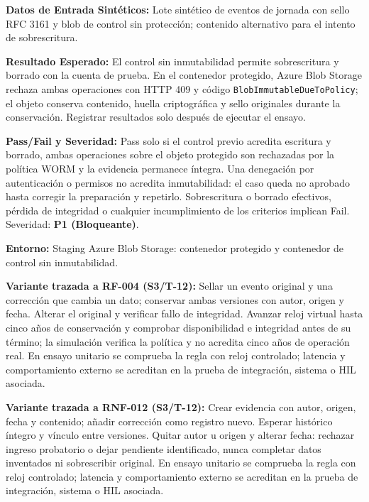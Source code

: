 \par\noindent\textbf{Datos de Entrada Sintéticos:} Lote sintético de eventos de jornada con sello RFC 3161 y blob de control sin protección; contenido alternativo para el intento de sobrescritura.\par
\par\noindent\textbf{Resultado Esperado:} El control sin inmutabilidad permite sobrescritura y borrado con la cuenta de prueba. En el contenedor protegido, Azure Blob Storage rechaza ambas operaciones con HTTP 409 y código \texttt{Blob\allowbreak{}Immutable\allowbreak{}Due\allowbreak{}To\allowbreak{}Policy}; el objeto conserva contenido, huella criptográfica y sello originales durante la conservación. Registrar resultados solo después de ejecutar el ensayo.\par
\par\noindent\textbf{Pass/Fail y Severidad:} Pass solo si el control previo acredita escritura y borrado, ambas operaciones sobre el objeto protegido son rechazadas por la política WORM y la evidencia permanece íntegra. Una denegación por autenticación o permisos no acredita inmutabilidad: el caso queda no aprobado hasta corregir la preparación y repetirlo. Sobrescritura o borrado efectivos, pérdida de integridad o cualquier incumplimiento de los criterios implican Fail. Severidad: \textbf{P1 (Bloqueante)}.\par
\par\noindent\textbf{Entorno:} Staging Azure Blob Storage: contenedor protegido y contenedor de control sin inmutabilidad.\par




\par\noindent\textbf{Variante trazada a RF-004 (S3/T-12):} Sellar un evento original y una corrección que cambia un dato; conservar ambas versiones con autor, origen y fecha. Alterar el original y verificar fallo de integridad. Avanzar reloj virtual hasta cinco años de conservación y comprobar disponibilidad e integridad antes de su término; la simulación verifica la política y no acredita cinco años de operación real. En ensayo unitario se comprueba la regla con reloj controlado; latencia y comportamiento externo se acreditan en la prueba de integración, sistema o HIL asociada.\par

\par\noindent\textbf{Variante trazada a RNF-012 (S3/T-12):} Crear evidencia con autor, origen, fecha y contenido; añadir corrección como registro nuevo. Esperar histórico íntegro y vínculo entre versiones. Quitar autor u origen y alterar fecha: rechazar ingreso probatorio o dejar pendiente identificado, nunca completar datos inventados ni sobrescribir original. En ensayo unitario se comprueba la regla con reloj controlado; latencia y comportamiento externo se acreditan en la prueba de integración, sistema o HIL asociada.\par

